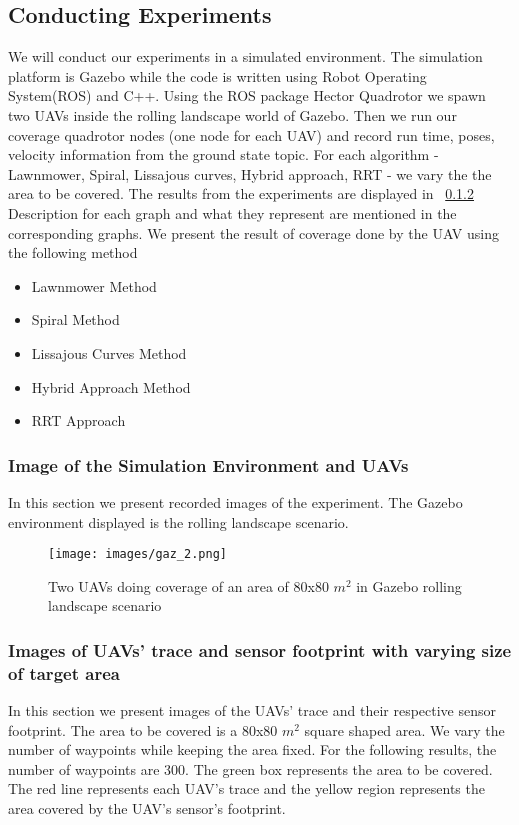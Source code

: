 \subsection{Conducting Experiments}
\label{subsec:exp2211}
We will conduct our experiments in a simulated environment. The simulation platform is Gazebo while the code is written using Robot Operating System(ROS) and C++. Using the ROS package Hector Quadrotor we spawn two UAVs inside the rolling landscape world of Gazebo. Then we run our coverage quadrotor nodes (one node for each UAV) and record run time, poses, velocity information from the ground state topic. For each algorithm - Lawnmower, Spiral, Lissajous curves, Hybrid approach, RRT - we vary the the area to be covered. The results from the experiments are displayed in ~\ref{subsubsec:patola122} Description for each graph and what they represent are mentioned in the corresponding graphs. We present the result of coverage done by the UAV using the following method
\begin{itemize}
\item Lawnmower Method
\item Spiral Method
\item Lissajous Curves Method
\item Hybrid Approach Method
\item RRT Approach
\end{itemize}

\subsubsection{Image of the Simulation Environment and UAVs}
In this section we present recorded images of the experiment. The Gazebo environment displayed is the rolling landscape scenario. 

\begin{figure}[htbp]

  \texttt{[image: images/gaz\_2.png]}
  \caption{Two UAVs doing coverage of an area of 80x80 $m^{2}$ in Gazebo rolling landscape scenario}\label{fig:esgil} 

\end{figure}

\subsubsection{Images of UAVs' trace and sensor footprint with varying size of target area}
\label{subsubsec:patola122}
In this section we present images of the UAVs' trace and their respective sensor footprint. The area to be covered is a 80x80 $m^{2}$ square shaped area. We vary the number of waypoints while keeping the area fixed. For the following results, the number of waypoints are 300. The green box represents the area to be covered. The red line represents each UAV's trace and the yellow region represents the area covered by the UAV's sensor's footprint. 

